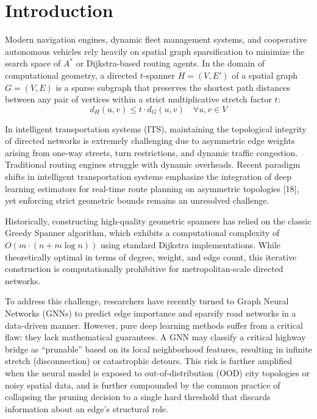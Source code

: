 \documentclass[journal]{IEEEtran}
\begin{document}
\section{Introduction}
Modern navigation engines, dynamic fleet management systems, and cooperative autonomous vehicles rely heavily on spatial graph sparsification to minimize the search space of $A^*$ or Dijkstra-based routing agents. In the domain of computational geometry, a directed $t$-spanner $H = (V, E')$ of a spatial graph $G = (V, E)$ is a sparse subgraph that preserves the shortest path distances between any pair of vertices within a strict multiplicative stretch factor $t$:
\begin{equation}
    d_H(u, v) \le t \cdot d_G(u, v) \quad \forall u, v \in V
\end{equation}

In intelligent transportation systems (ITS), maintaining the topological integrity of directed networks is extremely challenging due to asymmetric edge weights arising from one-way streets, turn restrictions, and dynamic traffic congestion. Traditional routing engines struggle with dynamic overheads. Recent paradigm shifts in intelligent transportation systems emphasize the integration of deep learning estimators for real-time route planning on asymmetric topologies [18], yet enforcing strict geometric bounds remains an unresolved challenge.

Historically, constructing high-quality geometric spanners has relied on the classic Greedy Spanner algorithm, which exhibits a computational complexity of $O(m \cdot (n + m \log n))$ using standard Dijkstra implementations. While theoretically optimal in terms of degree, weight, and edge count, this iterative construction is computationally prohibitive for metropolitan-scale directed networks.

To address this challenge, researchers have recently turned to Graph Neural Networks (GNNs) to predict edge importance and sparsify road networks in a data-driven manner. However, pure deep learning methods suffer from a critical flaw: they lack mathematical guarantees. A GNN may classify a critical highway bridge as ``prunable'' based on its local neighborhood features, resulting in infinite stretch (disconnection) or catastrophic detours. This risk is further amplified when the neural model is exposed to out-of-distribution (OOD) city topologies or noisy spatial data, and is further compounded by the common practice of collapsing the pruning decision to a single hard threshold that discards information about an edge's structural role.
\end{document}
